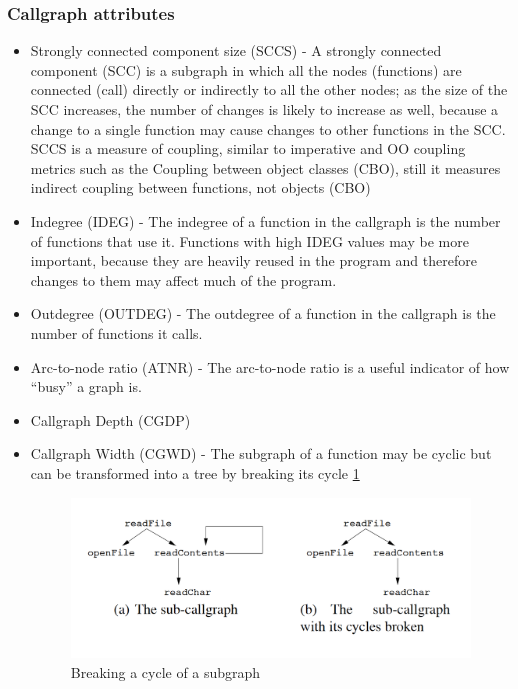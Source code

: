 \documentclass{article}
\begin{document}
\subsubsection{Callgraph attributes}
\begin{itemize}
\item Strongly connected component size (SCCS) - A strongly connected component (SCC) is a subgraph in which all the nodes (functions) are connected (call) directly or indirectly to all the other nodes; as the size of the SCC increases, the number of changes is likely to increase as well, because a change to a single function may cause changes to other functions in the SCC. SCCS is a measure of coupling, similar to imperative and OO coupling metrics such as the Coupling between object classes (CBO), still it measures indirect coupling between functions, not objects (CBO)
\item Indegree (IDEG) - The indegree of a function in the callgraph is the number of functions that use it. Functions with high IDEG values may be more important, because they are heavily reused in the program and therefore changes to them may affect much of the program.
\item Outdegree (OUTDEG) - The outdegree of a function in the callgraph is the number of functions it calls.
\item Arc-to-node ratio (ATNR) - The arc-to-node ratio is a useful indicator of how “busy” a graph is.
\item Callgraph Depth (CGDP)
\item Callgraph Width (CGWD) - The subgraph of a function may be cyclic but can be transformed into a tree by breaking its cycle \ref{fig:subgraph-brake}
\begin{figure}[h!]
  \includegraphics[width=\linewidth]{subgraph-brake.png}
  \caption{Breaking a cycle of a subgraph}
  \label{fig:subgraph-brake}
\end{figure}

\end{itemize}
\end{document}
